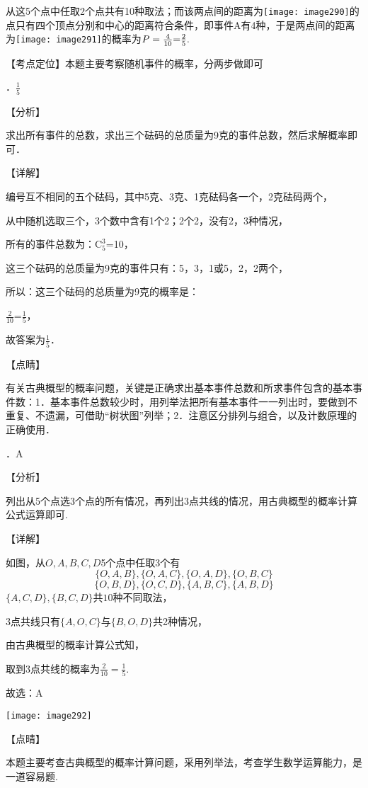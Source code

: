 \noindent 从这5个点中任取2个点共有10种取法；而该两点间的距离为\texttt{[image: image290]}的点只有四个顶点分别和中心的距离符合条件，即事件A有4种，于是两点间的距离为\texttt{[image: image291]}的概率为$P=\frac{4}{10} {\rm =}\frac{2}{5} .$

\noindent 【考点定位】本题主要考察随机事件的概率，分两步做即可

．$\frac{1}{5} $

\noindent 【分析】

\noindent 求出所有事件的总数，求出三个砝码的总质量为9克的事件总数，然后求解概率即可．

\noindent 【详解】

\noindent 编号互不相同的五个砝码，其中5克、3克、1克砝码各一个，2克砝码两个，

\noindent 从中随机选取三个，3个数中含有1个2；2个2，没有2，3种情况，

\noindent 所有的事件总数为：$\mathrm C_{5}^{3} $=10，

\noindent 这三个砝码的总质量为9克的事件只有：5，3，1或5，2，2两个，

\noindent 所以：这三个砝码的总质量为9克的概率是：

\noindent $\frac{2}{10} $=$\frac{1}{5} $，

\noindent 故答案为$\frac{1}{5} $．

\noindent 【点睛】

\noindent 有关古典概型的概率问题，关键是正确求出基本事件总数和所求事件包含的基本事件数：1．基本事件总数较少时，用列举法把所有基本事件一一列出时，要做到不重复、不遗漏，可借助``树状图''列举；2．注意区分排列与组合，以及计数原理的正确使用．

．A

\noindent 【分析】

\noindent 列出从5个点选3个点的所有情况，再列出3点共线的情况，用古典概型的概率计算公式运算即可.

\noindent 【详解】

\noindent 如图，从$O,A,B,C,D$5个点中任取3个有
\[\{ O,A,B\} ,\{ O,A,C\} ,\{ O,A,D\} ,\{ O,B,C\} \] 
\[\{ O,B,D\} ,\{ O,C,D\} ,\{ A,B,C\} ,\{ A,B,D\} \] 
$\{ A,C,D\} ,\{ B,C,D\} $共$10$种不同取法，

\noindent 3点共线只有$\{ A,O,C\} $与$\{ B,O,D\} $共2种情况，

\noindent 由古典概型的概率计算公式知，

\noindent 取到3点共线的概率为$\frac{2}{10} =\frac{1}{5} $.

\noindent 故选：A

\noindent \texttt{[image: image292]}

\noindent 【点晴】

\noindent 本题主要考查古典概型的概率计算问题，采用列举法，考查学生数学运算能力，是一道容易题.


